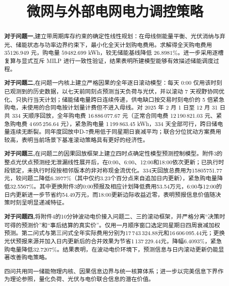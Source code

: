 \documentclass[withoutpreface,bwprint]{cumcmthesis}
\title{微网与外部电网电力调控策略}  %
\begin{document}
	
\maketitle
\begin{abstract}


\textbf{对于问题一,}建立带周期库存约束的确定性线性规划：在母线侧能量平衡、光伏消纳与弃光、储能状态与功率边界约束下，最小化全天计划购电费用。求解得全天购电费用 $35126.949$ 元，购电量 $59482.699$ kWh，较无储能基线降低 $26.8981\%$。进一步采用逐槽复算与显式互斥 MILP 进行一致性验证，结果表明所建模型能够有效描述储能调度过程。

\textbf{对于问题二,}在问题一内核上建立严格因果的全年逐日滚动模型：每天 0:00 仅用该时刻已观测到的历史数据，以七天前同刻点预测当天负荷与光伏，并以滚动 7 天视野协同优化、只执行当天计划；储能储电量跨日连续传递，供电缺口按交易时刻电价的 5 倍紧急购电，未使用的合同电按计划量计费但不进入母线。对 2025 年 2 月 1 日至 12 月 31 日共 334 天顺序回放，全年购电费 16\,886\,077.67 元（正常合同电费 12\,190\,821.03 元、紧急购电费 4\,695\,256.64 元），紧急购电量 1\,199\,863.45 kWh，334 天全部可行，跨日储电量连续无断裂。同年度回放中D-7费用低于同星期日衰减平均；联合分位扰动方案费用较高，表明当前场景下基准滚动策略具有更好的经济性。

\textbf{对于问题三,}在问题二的因果回放框架上建立四时点确定性模型预测控制模型。附件3的整点光伏点预测经无泄漏线性展开后，在0:00、6:00、12:00和18:00依次更新；已执行时段锁定，未执行时段按相邻版本的非对称现金流优化。334天回放总费用为15805751.77元，较问题二降低6.3977\%（其中仅约3.23个百分点来自追加日内更新），紧急购电量降低32.5567\%。其中更换附件3的0:00预报及相应计划降低费用53.54万元，6:00与12:00的日内更新进一步节省约54.49万元，而18:00更新边际收益近零，表明预报信息价值随决策时刻呈明显递减特征。

\textbf{对于问题四,}将附件4的10分钟波动电价接入问题二、三的滚动框架，并严格分离“决策时可得的预测价”和“事后结算的真实价”。仅用一月顺序窗口选定同星期日四周衰减加权预测。第二问式与第三问式全年实际费用分别为17\,743\,324.88元和16\,606\,095.44元；更换光伏预报来源并加入日内更新后的合并效果为节省1\,137\,229.44元，降幅6.4093\%，紧急购电量降低32.7207\%。结果表明，在波动电价环境下，预测信息与日内滚动更新仍能显著改善购电策略。

四问共用同一储能物理内核、因果信息边界与统一核算体系；进一步以完美信息下界作为理论参照，量化负荷、光伏与电价联合信息的潜在价值。




\end{abstract}
\end{document}
